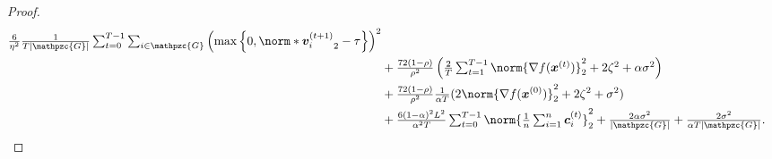 \documentclass{article}
\newcommand{\gset}{\ensuremath{{\mathpzc{G}}}}
\begin{document}
\begin{proof}
\begin{align*}
    \tfrac{6}{\eta^2}\tfrac{1}{T|\gset|}\tsum_{t=0}^{T-1}\tsum_{i\in\gset} \left(\max\left\{0, \norm*{\vv_i^{(t+1)}}_2-\tau\right\}\right)^2 \\
        & +
    \tfrac{72(1-\rho)}{\rho^2} \left(\tfrac{2}{T}\tsum_{t=1}^{T-1} \norm{\nabla f(\xx^{(t)}) }_2^2
    +  2  \zeta^2
    + \alpha\sigma^2 \right)                                                                                                                 \\
        & + \tfrac{72(1-\rho)}{\rho^2} \tfrac{1}{\alpha T}(2\norm{\nabla f(\xx^{(0)}) }_2^2
    + 2 \zeta^2 + \sigma^2)                                                                                                                  \\
        & + \tfrac{6(1-\alpha)^2L^2}{\alpha^2T} \tsum_{t=0}^{T-1}
    \norm{ \tfrac{1}{n} \tsum_{i=1}^n \cc_i^{(t)} }_2^2
    + \tfrac{2\alpha\sigma^2}{|\gset|} + \tfrac{2\sigma^2}{ \alpha  T|\gset|}.
  \end{align*}


\end{proof}
\end{document}
